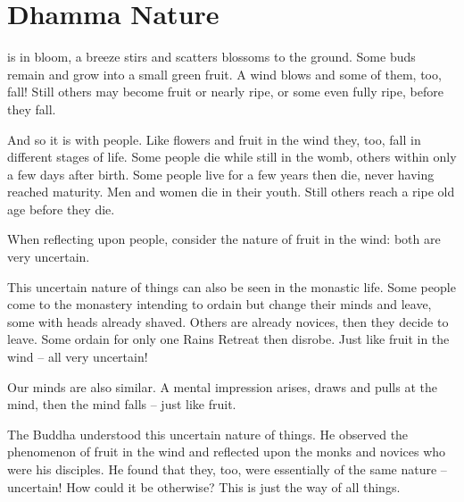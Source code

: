 
\chapter{Dhamma Nature}

\vspace*{0.5\baselineskip}
 is in bloom, a breeze stirs and scatters blossoms to the ground. Some buds remain and grow into a small green fruit. A wind blows and some of them, too, fall! Still others may become fruit or nearly ripe, or some even fully ripe, before they fall.

And so it is with people. Like flowers and fruit in the wind they, too, fall in different stages of life. Some people die while still in the womb, others within only a few days after birth. Some people live for a few years then die, never having reached maturity. Men and women die in their youth. Still others reach a ripe old age before they die.

When reflecting upon people, consider the nature of fruit in the wind: both are very uncertain.

This uncertain nature of things can also be seen in the monastic life. Some people come to the monastery intending to ordain but change their minds and leave, some with heads already shaved. Others are already novices, then they decide to leave. Some ordain for only one Rains Retreat then disrobe. Just like fruit in the wind -- all very uncertain!

Our minds are also similar. A mental impression arises, draws and pulls at the mind, then the mind falls -- just like fruit.

The Buddha understood this uncertain nature of things. He observed the phenomenon of fruit in the wind and reflected upon the monks and novices who were his disciples. He found that they, too, were essentially of the same nature -- uncertain! How could it be otherwise? This is just the way of all things.

